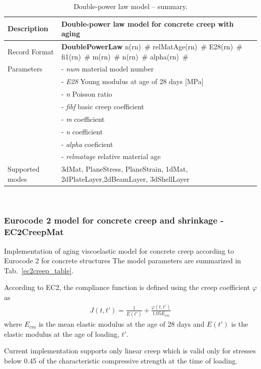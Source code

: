 \documentclass[a4paper]{article}
\newcommand{\descitem}[1]{{\noindent \bf #1}}
\newcommand{\elemparam}[2]{{{#1\tiny (#2)}~\#}}
\newcommand{\param}[1]{{\it #1}}
\newenvironment{mmt}{\begin{tabular}{|l|p{9cm}|}}{\end{tabular}\\}
\newenvironment{mmt}{\begin{tabular}{|l|l|}}{\end{tabular}\\}
\begin{document}
\begin{table}[!htb]
\begin{mmt}
\hline
Description & Double-power law model  for concrete creep with aging\\
\hline
Record Format & \descitem{DoublePowerLaw}  \elemparam{n}{rn}
\elemparam{relMatAge}{rn} \elemparam{E28}{rn} \elemparam{fi1}{rn} \elemparam{m}{rn}
\elemparam{n}{rn} \elemparam{alpha}{rn} \\
Parameters &- \param{num} material model number\\
&- \param{E28} Young modulus at age of 28 days [MPa]\\
&- \param{n} Poisson ratio\\
&- \param{fibf} basic creep coefficient\\
&- \param{m} coefficient \\
&- \param{n} coefficient \\
&- \param{alpha} coeficient \\
&- \param{relmatage} relative material age \\
Supported modes& 3dMat, PlaneStress, PlaneStrain, 1dMat,
2dPlateLayer,2dBeamLayer, 3dShellLayer\\
\hline
\end{mmt}
\caption{Double-power law model -- summary.}
\label{doublepowerlaw_table}
\end{table}


\subsubsection{Eurocode 2 model for concrete creep and shrinkage - EC2CreepMat}
Implementation of aging viscoelastic model for concrete creep
according to Eurocode 2 for concrete structures
The model parameters are summarized
in Tab.~\ref{ec2creep_table}.


According to EC2, the compliance function is defined using the creep
coefficient $\varphi$ as
\begin{eqnarray}
J(t,t') = \frac{1}{E(t')} + \frac{\varphi(t,t')}{ 1.05 E_{cm}}
\end{eqnarray}
where $E_{cm}$ is the mean elastic modulus at the age of 28 days and
$E(t')$ is the elastic modulus at the age of loading, $t'$.

Current implementation supports only linear creep which is valid only for
stresses below 0.45 of the characteristic compressive strength at the time of
loading.
\end{document}
